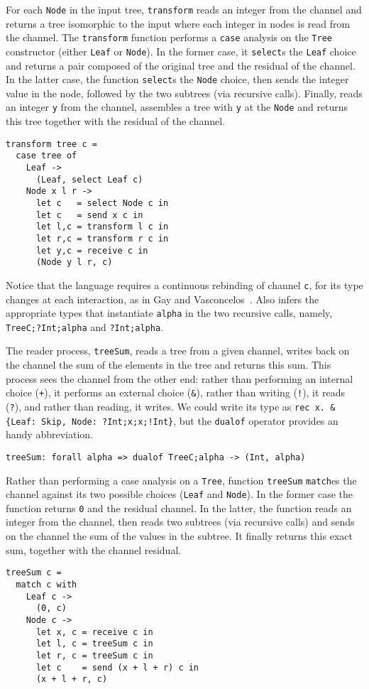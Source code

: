 For each \lstinline|Node| in the input tree, \lstinline|transform|
reads an integer from the channel and returns a tree isomorphic to the
input where each integer in nodes is read from the channel.
%
The \lstinline|transform| function performs a \lstinline|case|
analysis on the \lstinline|Tree| constructor (either \lstinline|Leaf|
or \lstinline|Node|). In the former case, it \lstinline|select|s the
\lstinline|Leaf| choice and returns a pair composed of the original
tree and the residual of the channel. In the latter case, the function
\lstinline|select|s the \lstinline|Node| choice, then sends the
integer value in the node, followed by the two subtrees (via recursive
calls). Finally, reads an integer \lstinline|y| from the channel,
assembles a tree with \lstinline|y| at the \lstinline|Node| and
returns this tree together with the residual of the channel.
%
\begin{lstlisting}
transform tree c =
  case tree of
    Leaf ->
      (Leaf, select Leaf c)
    Node x l r ->
      let c   = select Node c in
      let c   = send x c in
      let l,c = transform l c in
      let r,c = transform r c in
      let y,c = receive c in
      (Node y l r, c)
\end{lstlisting}

Notice that the language requires a continuous rebinding of channel
\lstinline|c|, for its type changes at each interaction, as in Gay and
Vasconcelos~\cite{DBLP:journals/jfp/GayV10}. Also \freest{} infers the
appropriate types that instantiate \lstinline|alpha| in the two
recursive calls, namely, \lstinline|TreeC;?Int;alpha| and
\lstinline|?Int;alpha|.

The reader process, \lstinline|treeSum|, reads a tree from a given
channel, writes back on the channel the sum of the elements in the
tree and returns this sum. This process sees the channel from the
other end: rather than performing an internal choice (\lstinline|+|),
it performs an external choice (\lstinline|&|), rather than writing
(\lstinline|!|), it reads (\lstinline|?|), and rather than reading, it
writes. We could write its type as
\lstinline|rec x. &{Leaf: Skip, Node: ?Int;x;x;!Int}|,
but the \lstinline|dualof| operator provides an handy abbreviation.
%
\begin{lstlisting}
treeSum: forall alpha => dualof TreeC;alpha -> (Int, alpha)
\end{lstlisting}

Rather than performing a case analysis on a \lstinline|Tree|, function
\lstinline|treeSum| \lstinline|match|es the channel against its two
possible choices (\lstinline|Leaf| and \lstinline|Node|). In the
former case the function returns \lstinline|0| and the residual
channel. In the latter, the function reads an integer from the
channel, then reads two subtrees (via recursive calls) and sends on
the channel the sum of the values in the subtree. It finally returns
this exact sum, together with the channel residual.
%
\begin{lstlisting}
treeSum c =
  match c with
    Leaf c ->
      (0, c)
    Node c ->
      let x, c = receive c in
      let l, c = treeSum c in
      let r, c = treeSum c in
      let c    = send (x + l + r) c in
      (x + l + r, c)
\end{lstlisting}

